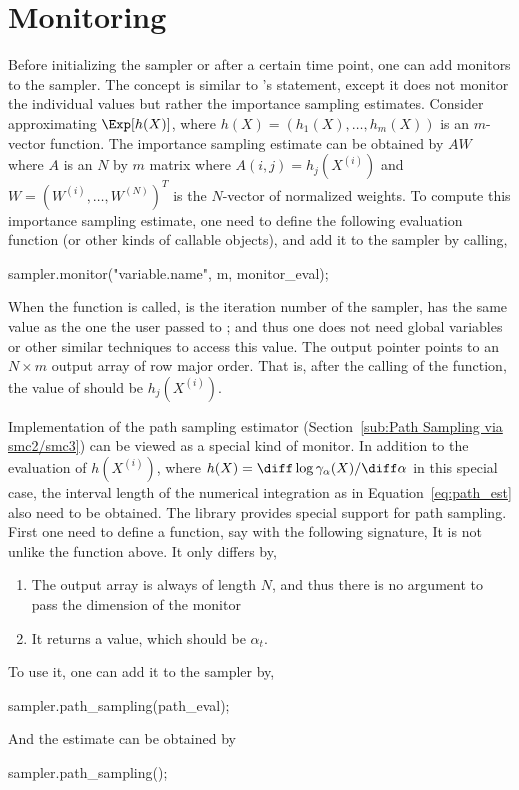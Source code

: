 \section{Monitoring}
\label{sec:Monitoring}

Before initializing the sampler or after a certain time point, one can add
monitors to the sampler. The concept is similar to \bugs's 
statement, except it does not monitor the individual values but rather the
importance sampling estimates. Consider approximating $\Exp[h(X)]$, where
$h(X) = (h_1(X),\dots,h_m(X))$ is an $m$-vector function. The importance
sampling estimate can be obtained by $AW$ where $A$ is an $N$ by $m$ matrix
where $A(i,j) = h_j(X^{(i)})$ and $W = (W^{(i)},\dots,W^{(N)})^T$ is the
$N$-vector of normalized weights. To compute this importance sampling
estimate, one need to define the following evaluation function (or other kinds
of callable objects),
and add it to the sampler by calling,
\begin{cppcode}
sampler.monitor("variable.name", m, monitor_eval);
\end{cppcode}
When the function  is called,  is the
iteration number of the sampler,  has the same value as the one
the user passed to ; and thus one does not need
global variables or other similar techniques to access this value. The output
pointer  points to an $N \times m$ output array of row major
order. That is, after the calling of the function, the value of
 should be $h_j(X^{(i)})$.

Implementation of the path sampling estimator (Section~\ref{sub:Path Sampling
  via smc2/smc3}) can be viewed as a special kind of monitor. In addition to
the evaluation of $h(X^{(i)})$, where $h(X) =
\diff\log\gamma_{\alpha}(X)/\diff\alpha$ in this special case, the interval
length of the numerical integration as in Equation~\eqref{eq:path_est} also
need to be obtained. The \vsmc library provides special support for path
sampling. First one need to define a function, say  with
the following signature,
It is not unlike the  function above. It only differs
by,
\begin{enumerate}
  \item The output array  is always of length $N$, and thus
    there is no argument to pass the dimension of the monitor
  \item It returns a value, which should be $\alpha_t$.
\end{enumerate}
To use it, one can add it to the sampler by,
\begin{cppcode}
sampler.path_sampling(path_eval);
\end{cppcode}
And the estimate can be obtained by
\begin{cppcode}
sampler.path_sampling();
\end{cppcode}

